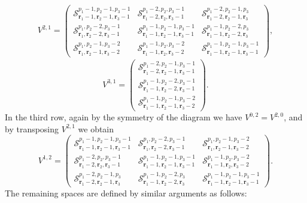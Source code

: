 \documentclass[final]{amsart}%
\newcommand{\0}{\mathaccent23}
\newcommand{\br}{\mathbf r}
\begin{document}
\begin{gather}
\label{diagram-V21}
V^{2, 1}=
\begin{pmatrix}
\mathcal S^{p_{1}-1, p_{2}-1, p_{3}-1}_{  \br_{1}-1,  \br_{2}-1,  \br_{3}-1} &\mathcal S^{p_{1}-2, p_{2}, p_{3}-1}_{  \br_{1}-2,  \br_{2},  \br_{3}-1}&\mathcal S^{p_{1}-2, p_{2}-1, p_{3}}_{  \br_{1}-2,  \br_{2}-1,  \br_{3}} \\
\mathcal S^{p_{1},p_{2}-2,p_{3}-1}_{  \br_{1}, \br_{2}-2, \br_{3}-1}&\mathcal S^{p_{1}-1, p_{2}-1, p_{3}-1}_{  \br_{1}-1,  \br_{2}-1,  \br_{3}-1}&
\mathcal S^{p_{1}-1, p_{2}-2, p_{3}}_{  \br_{1}-1,  \br_{2}-2,  \br_{3}}\\
\mathcal S^{p_{1}, p_{2}-1, p_{3}-2}_{  \br_{1},  \br_{2}-1,  \br_{3}-2} & \mathcal S^{p_{1}-1, p_{2}, p_{3}-2}_{  \br_{1}-1,  \br_{2},  \br_{3}-2}& \mathcal S^{p_{1}-1, p_{2}-1, p_{3}-1}_{  \br_{1}-1,  \br_{2}-1,  \br_{3}-1}
\end{pmatrix},
\end{gather}
$$
V^{3, 1}=
\begin{pmatrix}
\mathcal S^{p_{1}-2, p_{2}-1, p_{3}-1}_{  \br_{1}-2,  \br_{2}-1,  \br_{3}-1}\\
\mathcal S^{p_{1}-1, p_{2}-2, p_{3}-1}_{  \br_{1}-1,  \br_{2}-2,  \br_{3}-1}\\
\mathcal S^{p_{1}-1, p_{2}-1, p_{3}-2}_{  \br_{1}-1,  \br_{2}-1,  \br_{3}-2}
\end{pmatrix}.
$$
In the third row, again by the symmetry of the diagram we have $V^{0, 2}=V^{2, 0}$, and by transposing $V^{2,1}$ we obtain
$$
V^{1, 2}=%
\begin{pmatrix}
\mathcal S^{p_{1}-1, p_{2}-1, p_{3}-1}_{  \br_{1}-1,  \br_{2}-1,  \br_{3}-1} &\mathcal S^{p_{1}, p_{2}-2, p_{3}-1}_{  \br_{1},  \br_{2}-2,  \br_{3}-1} &\mathcal S^{p_{1}, p_{2}-1, p_{3}-2}_{  \br_{1},  \br_{2}-1,  \br_{3}-2} \\
\mathcal S^{p_{1}-2,p_{2},p_{3}-1}_{  \br_{1}-2, \br_{2}, \br_{3}-1}&\mathcal S^{p_{1}-1, p_{2}-1, p_{3}-1}_{  \br_{1}-1,  \br_{2}-1,  \br_{3}-1}&\mathcal S^{p_{1}-1, p_{2}, p_{3}-2}_{  \br_{1}-1,  \br_{2},  \br_{3}-2}\\
\mathcal S^{p_{1}-2, p_{2}-1, p_{3}}_{  \br_{1}-2,  \br_{2}-1,  \br_{3}} & \mathcal S^{p_{1}-1, p_{2}-2, p_{3}}_{  \br_{1}-1,  \br_{2}-2,  \br_{3}}& \mathcal S^{p_{1}-1, p_{2}-1, p_{3}-1}_{  \br_{1}-1,  \br_{2}-1,  \br_{3}-1}
\end{pmatrix}.
$$
The remaining spaces are defined by similar arguments as follows:
\end{document}
